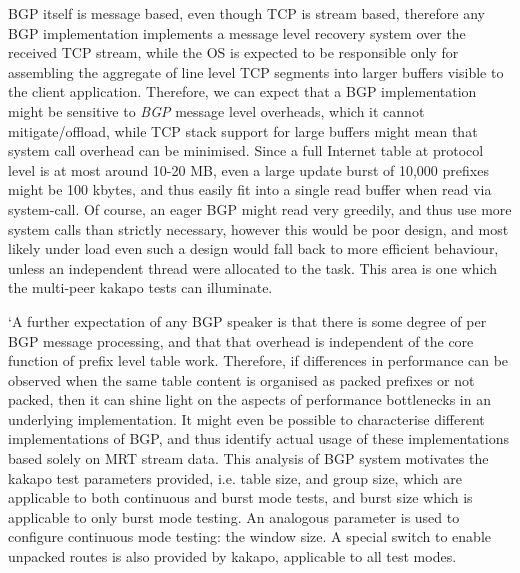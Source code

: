 BGP itself is message based, even though TCP is stream based, therefore any BGP implementation implements a message level recovery system over the received TCP stream, while the OS is expected to be responsible only for assembling the aggregate of line level TCP segments into larger buffers visible to the client application.
Therefore, we can expect that a BGP implementation might be sensitive to \textit{BGP} message level overheads, which it cannot mitigate/offload, while TCP stack support for large buffers might mean that system call overhead can be minimised.
Since a full Internet table at protocol level is at most around 10-20 MB, even a large update burst of 10,000 prefixes might be 100 kbytes, and thus easily fit into a single read buffer when read via system-call.
Of course, an eager BGP might read very greedily, and thus use more system calls than strictly necessary, however this would be poor design, and most likely under load even such a design would fall back to more efficient behaviour, unless an independent thread were allocated to the task.
This area is one which the multi-peer kakapo tests can illuminate.

`A further expectation of any BGP speaker is that there is some degree of per BGP message processing, and that that overhead is independent of the core function of prefix level table work.
Therefore, if differences in performance can be observed when the same table content is organised as packed prefixes or not packed, then it can shine light on the aspects of performance bottlenecks in an underlying implementation.
It might even be possible to characterise different implementations of BGP, and thus identify actual usage of these implementations based solely on MRT stream data.
This analysis of BGP system motivates the kakapo test parameters provided, i.e. table size, and group size, which are applicable to both continuous and burst mode tests, and burst size which is applicable to only burst mode testing.
An analogous parameter is used to configure continuous mode testing: the window size.
A special switch to enable unpacked routes is also provided by kakapo, applicable to all test modes.

